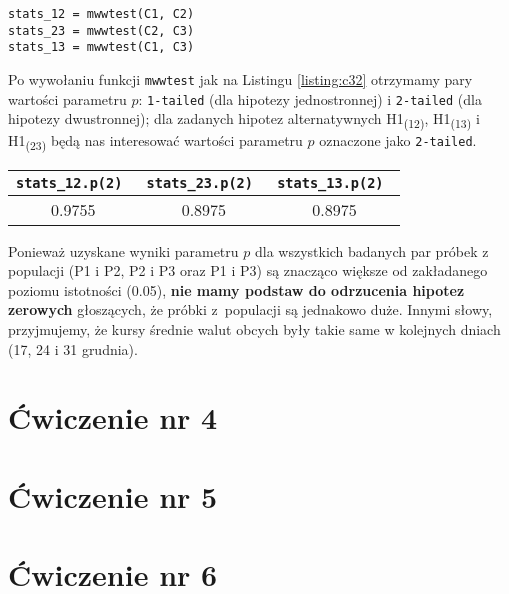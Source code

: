 \documentclass[12pt, a4paper]{article}
\begin{document}
\begin{lstlisting}[frame=single,label={listing:c32},caption={badanie, czy wartości próbek z populacji są jednakowo duże.},captionpos=b]
stats_12 = mwwtest(C1, C2)
stats_23 = mwwtest(C2, C3)
stats_13 = mwwtest(C1, C3)
\end{lstlisting}

Po wywołaniu funkcji \texttt{mwwtest} jak na Listingu \ref{listing:c32} otrzymamy pary wartości parametru $p$: \texttt{1-tailed} (dla hipotezy jednostronnej) i \texttt{2-tailed} (dla hipotezy dwustronnej); dla zadanych hipotez alternatywnych H1\textsubscript{(12)}, H1\textsubscript{(13)} i H1\textsubscript{(23)} będą nas interesować wartości parametru $p$ oznaczone jako \texttt{2-tailed}.

\begin{center}
  \begin{tabular}{|c|c|c|}\hline
    \tt stats\_12.p(2) & \tt stats\_23.p(2) & \tt stats\_13.p(2) \\\hline
    0.9755 & 0.8975 & 0.8975 \\\hline
  \end{tabular}
  \label{table:c32}
\end{center}

Ponieważ uzyskane wyniki parametru $p$ dla wszystkich badanych par próbek z populacji (P1 i P2, P2 i P3 oraz P1 i P3) są znacząco większe od zakładanego poziomu istotności (0.05), \textbf{nie mamy podstaw do odrzucenia hipotez zerowych} głoszących, że próbki z~populacji są jednakowo duże. Innymi słowy, przyjmujemy, że kursy średnie walut obcych były takie same w kolejnych dniach (17, 24 i 31 grudnia).


\section*{Ćwiczenie nr 4}

\section*{Ćwiczenie nr 5}

\section*{Ćwiczenie nr 6}
\end{document}
